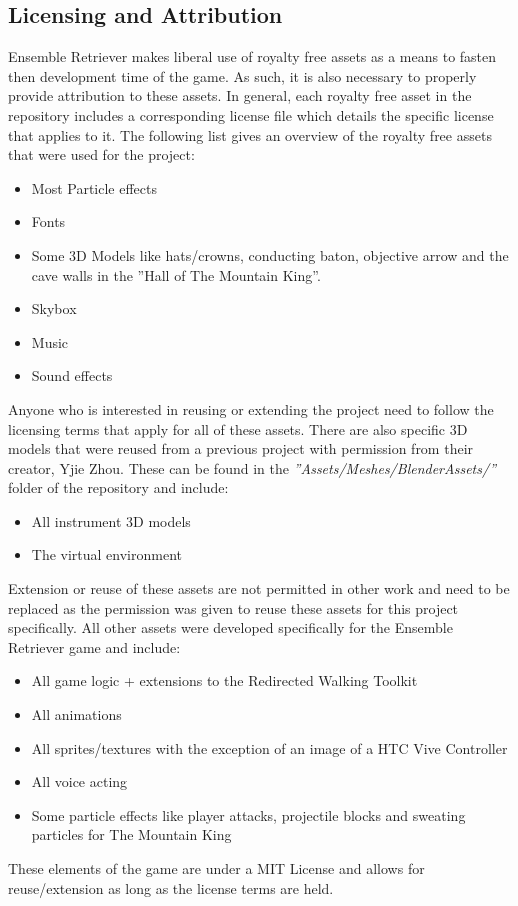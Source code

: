 \subsection{Licensing and Attribution}
Ensemble Retriever makes liberal use of royalty free assets as a means to fasten then development time of the game. As such, it is also necessary to properly provide attribution to these assets. In general, each royalty free asset in the repository includes a corresponding license file which details the specific license that applies to it. The following list gives an overview of the royalty free assets that were used for the project:
\begin{itemize}
    \item Most Particle effects
    \item Fonts
    \item Some 3D Models like hats/crowns, conducting baton, objective arrow and the cave walls in the ''Hall of The Mountain King''.
    \item Skybox
    \item Music
    \item Sound effects
\end{itemize}
Anyone who is interested in reusing or extending the project need to follow the licensing terms that apply for all of these assets. There are also specific 3D models that were reused from a previous project with permission from their creator, Yjie Zhou. These can be found in the \emph{''Assets/Meshes/BlenderAssets/''} folder of the repository and include:
\begin{itemize}
    \item All instrument 3D models
    \item The virtual environment
\end{itemize}
Extension or reuse of these assets are not permitted in other work and need to be replaced as the permission was given to reuse these assets for this project specifically. All other assets were developed specifically for the Ensemble Retriever game and include:
\begin{itemize}
    \item All game logic + extensions to the Redirected Walking Toolkit
    \item All animations
    \item All sprites/textures with the exception of an image of a HTC Vive Controller
    \item All voice acting
    \item Some particle effects like player attacks, projectile blocks and sweating particles for The Mountain King 
\end{itemize}
These elements of the game are under a MIT License and allows for reuse/extension as long as the license terms are held. 

